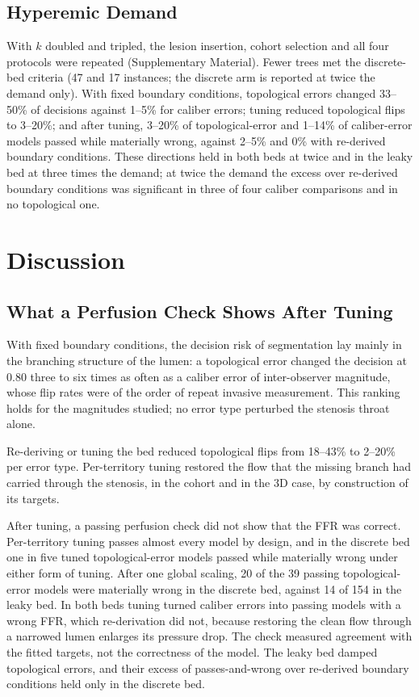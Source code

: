 \documentclass[journal,twoside,web]{ieeecolor}
\begin{document}
\subsection{Hyperemic Demand}\label{sec:demand}
With $k$ doubled and tripled, the lesion insertion, cohort selection and all four protocols were repeated (Supplementary
Material). Fewer trees met the discrete-bed
criteria (47 and 17 instances; the discrete arm is reported at twice the demand only).
With fixed boundary conditions, topological errors changed 33--50\% of decisions against 1--5\% for caliber errors;
tuning reduced topological flips to 3--20\%; and after tuning, 3--20\% of topological-error and 1--14\% of
caliber-error models passed while materially wrong, against 2--5\% and 0\% with re-derived boundary conditions. These
directions held in both beds at twice and in the leaky bed at three times the demand; at twice the demand the
excess over re-derived boundary conditions was significant in three of four caliber comparisons and in no
topological one.

\section{Discussion}
\subsection{What a Perfusion Check Shows After Tuning}
With fixed boundary conditions, the decision risk of segmentation lay mainly in the branching
structure of the lumen: a topological error changed the decision at 0.80 three to six times as often as a caliber
error of inter-observer magnitude, whose flip rates were of the order of repeat invasive measurement. This ranking
holds for the magnitudes studied; no error type perturbed the stenosis throat alone.

Re-deriving or tuning the bed reduced topological flips from 18--43\% to 2--20\% per error type. Per-territory
tuning restored the flow that the missing branch had carried through the stenosis, in the cohort and in the 3D case, by construction of its targets.

After tuning, a passing perfusion check did not show that the FFR was correct. Per-territory tuning passes
almost every model by design, and in the discrete bed one in five tuned topological-error models passed while
materially wrong under either form of tuning. After one global scaling, 20 of the 39 passing topological-error models were materially wrong in the discrete bed, against 14 of 154 in the leaky bed. In both beds tuning turned
caliber errors into passing models with a wrong FFR, which re-derivation did not, because restoring the clean flow through a narrowed lumen enlarges
its pressure drop. The check measured agreement with the fitted targets, not the correctness of the model. The leaky
bed damped topological errors, and their excess of passes-and-wrong over re-derived boundary conditions held only in
the discrete bed.
\end{document}
